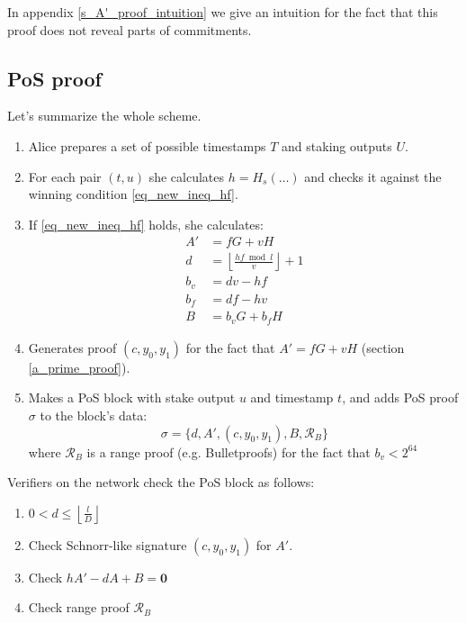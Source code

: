 \documentclass{article}
\newcommand{\floor}[1]{\left\lfloor #1 \right\rfloor}
\numberwithin{figure}{section}
\begin{document}
In appendix \ref{s_A'_proof_intuition} we give an intuition for the fact that this proof does not reveal parts of commitments.

\subsection{PoS proof} \label{ssec_pos_proof}

Let's summarize the whole scheme.

\begin{enumerate}
    \item Alice prepares a set of possible timestamps $T$ and staking outputs $U$.
    
    \item For each pair $(t, u)$ she calculates $h = H_s(\dots)$ and checks it against the winning condition \eqref{eq_new_ineq_hf}.
    
    \item If \eqref{eq_new_ineq_hf} holds, she calculates:
    \[ \begin{split}
    A' &= fG + vH \\
    d &= \floor{\frac{hf \bmod l}{v}} + 1\\
    b_v &= dv - hf \\
    b_f &= df - hv \\
    B &= b_v G + b_f H
    \end{split}
    \]
    
    \item Generates proof $(c, y_0, y_1)$ for the fact that $A' = fG + vH$ (section \ref{a_prime_proof}).
    
    \item Makes a PoS block with stake output $u$ and timestamp $t$, and adds PoS proof $\sigma$ to the block's data:
    \begin{equation} \label{eq_pos_proof}
    \sigma = \{ d, A', (c, y_0, y_1), B, \mathcal{R}_B \}
    \end{equation}
    where $\mathcal{R}_B$ is a range proof (e.g. Bulletproofs) for the fact that $b_v < 2^{64}$ 
\end{enumerate}

\noindent 
Verifiers on the network check the PoS block as follows:

\begin{enumerate}
    \item $0 < d \leq \floor{\frac{l}{D}}$
    
    \item Check Schnorr-like signature $(c, y_0, y_1)$ for $A'$.
    
    \item Check $hA'-dA+B=\mathbf{0}$
    
    \item Check range proof $\mathcal{R}_B$
\end{enumerate}
\end{document}
